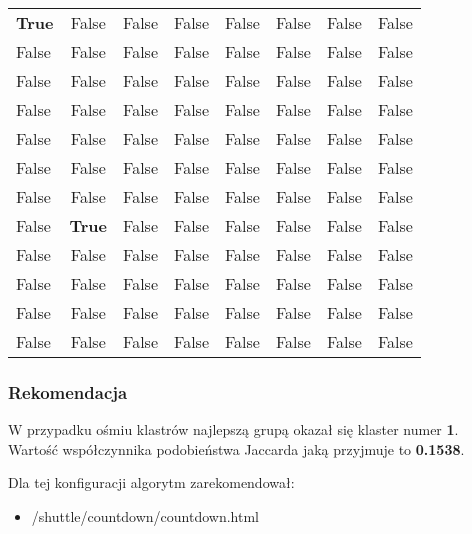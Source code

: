 \documentclass{classrep}
\begin{document}
\begin{table}[H]
{\begin{tabular}{@{}lccccccc@{}}
\textbf{True}  &  False  &  False  &  False  &  False  &  False  &  False  &  False\\
False  &  False  &  False  &  False  &  False  &  False  &  False  &  False\\
False  &  False  &  False  &  False  &  False  &  False  &  False  &  False\\
False  &  False  &  False  &  False  &  False  &  False  &  False  &  False\\
False  &  False  &  False  &  False  &  False  &  False  &  False  &  False\\
False  &  False  &  False  &  False  &  False  &  False  &  False  &  False\\
False  &  False  &  False  &  False  &  False  &  False  &  False  &  False\\
False  &   \textbf{True}  &  False  &  False  &  False  &  False  &  False  &  False\\
False  &  False  &  False  &  False  &  False  &  False  &  False  &  False\\
False  &  False  &  False  &  False  &  False  &  False  &  False  &  False\\
False  &  False  &  False  &  False  &  False  &  False  &  False  &  False\\
False  &  False  &  False  &  False  &  False  &  False  &  False  &  False\\

    \bottomrule
    \end{tabular}%
    }
    \end{table}
\newpage
\subsubsection{Rekomendacja}
W przypadku ośmiu klastrów najlepszą grupą okazał się klaster numer \textbf{1}. Wartość współczynnika podobieństwa Jaccarda jaką przyjmuje to \textbf{0.1538}.

\begin{table}[H]
\centering
\caption{Wartości współczynnika podobieństwa Jaccarda dla nowego użytkownika i każdego klastra}
\label{tab:apriori_num_params}
\end{table}
Dla tej konfiguracji algorytm zarekomendował:
\begin{itemize}
  \item /shuttle/countdown/countdown.html
\end{itemize}
\end{document}
